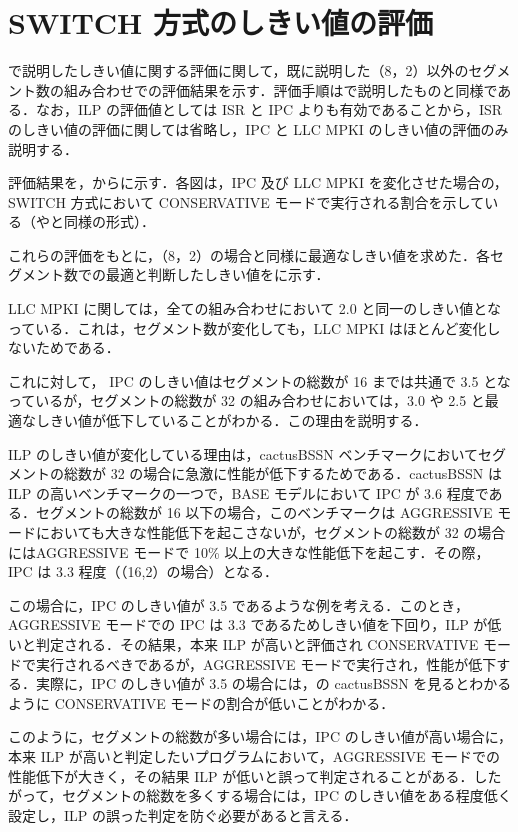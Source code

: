 
\chapter{SWITCH 方式のしきい値の評価}
\label{sec:appendix2}

で説明したしきい値に関する評価に関して，既に説明した（8，2）以外のセグメント数の組み合わせでの評価結果を示す．評価手順はで説明したものと同様である．なお，ILP の評価値としては ISR と IPC よりも有効であることから，ISR のしきい値の評価に関しては省略し，IPC と LLC MPKI のしきい値の評価のみ説明する．

評価結果を，からに示す．各図は，IPC 及び  LLC MPKI を変化させた場合の，SWITCH 方式において CONSERVATIVE モードで実行される割合を示している（やと同様の形式）．

これらの評価をもとに，（8，2）の場合と同様に最適なしきい値を求めた．各セグメント数での最適と判断したしきい値をに示す．

LLC MPKI に関しては，全ての組み合わせにおいて 2.0 と同一のしきい値となっている．これは，セグメント数が変化しても，LLC MPKI はほとんど変化しないためである．

これに対して， IPC のしきい値はセグメントの総数が 16 までは共通で 3.5 となっているが，セグメントの総数が 32 の組み合わせにおいては，3.0 や 2.5 と最適なしきい値が低下していることがわかる．この理由を説明する．

ILP のしきい値が変化している理由は，cactusBSSN ベンチマークにおいてセグメントの総数が 32 の場合に急激に性能が低下するためである．cactusBSSN は ILP の高いベンチマークの一つで，BASE モデルにおいて IPC が 3.6 程度である．セグメントの総数が 16 以下の場合，このベンチマークは AGGRESSIVE モードにおいても大きな性能低下を起こさないが，セグメントの総数が 32 の場合にはAGGRESSIVE モードで 10\% 以上の大きな性能低下を起こす．その際，IPC は 3.3 程度（（16,2）の場合）となる．

この場合に，IPC のしきい値が 3.5 であるような例を考える．このとき，AGGRESSIVE モードでの IPC は 3.3 であるためしきい値を下回り，ILP が低いと判定される．その結果，本来 ILP が高いと評価され CONSERVATIVE モードで実行されるべきであるが，AGGRESSIVE モードで実行され，性能が低下する．実際に，IPC のしきい値が 3.5 の場合には，の cactusBSSN を見るとわかるように CONSERVATIVE モードの割合が低いことがわかる．

このように，セグメントの総数が多い場合には，IPC のしきい値が高い場合に，本来 ILP が高いと判定したいプログラムにおいて，AGGRESSIVE モードでの性能低下が大きく，その結果 ILP が低いと誤って判定されることがある．したがって，セグメントの総数を多くする場合には，IPC のしきい値をある程度低く設定し，ILP の誤った判定を防ぐ必要があると言える．

